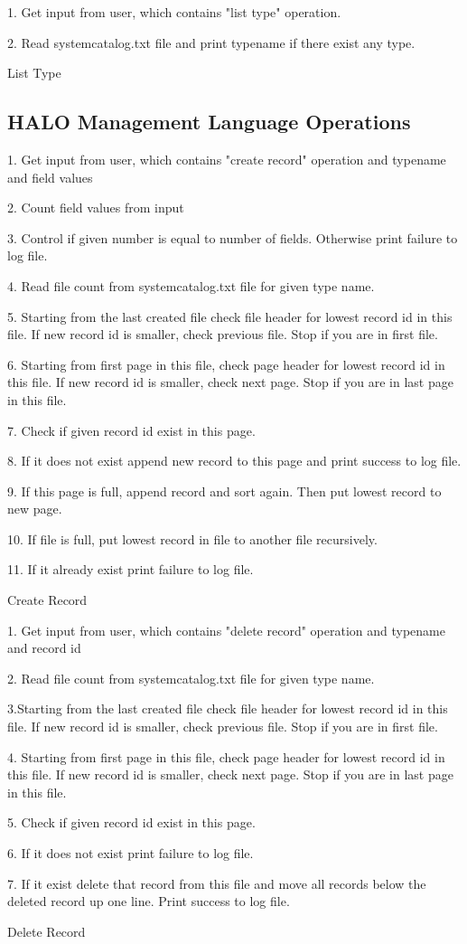 \documentclass{article}
\begin{document}
\begin{algorithm}[H]
 \item 1. Get input from user, which contains "list type" operation.
 \item 2. Read systemcatalog.txt file and print typename if there exist any type.
\caption{List Type}
\end{algorithm}

\subsection{HALO Management Language Operations}

\begin{algorithm}[H]
 \item1. Get input from user, which contains "create record" operation and typename and field values
 \item2. Count field values from input
 \item3. Control if given number is equal to number of fields. Otherwise print failure to log file.
 \item4. Read file count from systemcatalog.txt file for given type name.
 \item 5. Starting from the last created file check file header for lowest record id in this file. If new record id is smaller, check previous file. Stop if you are in first file.
 \item 6. Starting from first page in this file, check page header for lowest record id in this file. If new record id is smaller, check next page. Stop if you are in last page in this file. 
 \item 7. Check if given record id exist in this page.
 \item 8. If it does not exist append new record to this page  and print success to log file. 
 \item 9. If this page is full, append record and sort again. Then put lowest record to new page.
 \item 10. If file is full, put lowest record in file to another file recursively.
\item 11. If it already exist print failure to log file.
\caption{Create Record}
\end{algorithm}

\begin{algorithm}[H]
 \item1. Get input from user, which contains "delete record" operation and typename and record id
 \item2. Read file count from systemcatalog.txt file for given type name.
 \item3.Starting from the last created file check file header for lowest record id in this file. If new record id is smaller, check previous file. Stop if you are in first file.
 \item 4. Starting from first page in this file, check page header for lowest record id in this file. If new record id is smaller, check next page. Stop if you are in last page in this file. 
 \item 5. Check if given record id exist in this page.
 \item 6. If it does not exist print failure to log file. 
 \item 7. If it exist delete that record from this file and move all records below the deleted record up one line. Print success to log file.
\caption{Delete Record}
\end{algorithm}
\end{document}
